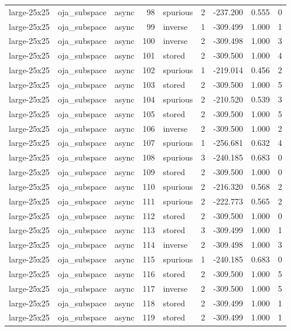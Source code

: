 \begin{tabular}{lllrlrrrr}
large-25x25 & oja\_subspace & async & 98 & spurious & 2 & -237.200 & 0.555 & 0 \\
large-25x25 & oja\_subspace & async & 99 & inverse & 1 & -309.499 & 1.000 & 1 \\
large-25x25 & oja\_subspace & async & 100 & inverse & 2 & -309.498 & 1.000 & 3 \\
large-25x25 & oja\_subspace & async & 101 & stored & 2 & -309.500 & 1.000 & 4 \\
large-25x25 & oja\_subspace & async & 102 & spurious & 1 & -219.014 & 0.456 & 2 \\
large-25x25 & oja\_subspace & async & 103 & stored & 2 & -309.500 & 1.000 & 5 \\
large-25x25 & oja\_subspace & async & 104 & spurious & 2 & -210.520 & 0.539 & 3 \\
large-25x25 & oja\_subspace & async & 105 & stored & 2 & -309.500 & 1.000 & 5 \\
large-25x25 & oja\_subspace & async & 106 & inverse & 2 & -309.500 & 1.000 & 2 \\
large-25x25 & oja\_subspace & async & 107 & spurious & 1 & -256.681 & 0.632 & 4 \\
large-25x25 & oja\_subspace & async & 108 & spurious & 3 & -240.185 & 0.683 & 0 \\
large-25x25 & oja\_subspace & async & 109 & stored & 2 & -309.500 & 1.000 & 0 \\
large-25x25 & oja\_subspace & async & 110 & spurious & 2 & -216.320 & 0.568 & 2 \\
large-25x25 & oja\_subspace & async & 111 & spurious & 2 & -222.773 & 0.565 & 2 \\
large-25x25 & oja\_subspace & async & 112 & stored & 2 & -309.500 & 1.000 & 0 \\
large-25x25 & oja\_subspace & async & 113 & stored & 3 & -309.499 & 1.000 & 1 \\
large-25x25 & oja\_subspace & async & 114 & inverse & 2 & -309.498 & 1.000 & 3 \\
large-25x25 & oja\_subspace & async & 115 & spurious & 1 & -240.185 & 0.683 & 0 \\
large-25x25 & oja\_subspace & async & 116 & stored & 2 & -309.500 & 1.000 & 5 \\
large-25x25 & oja\_subspace & async & 117 & inverse & 2 & -309.500 & 1.000 & 5 \\
large-25x25 & oja\_subspace & async & 118 & stored & 2 & -309.499 & 1.000 & 1 \\
large-25x25 & oja\_subspace & async & 119 & stored & 2 & -309.499 & 1.000 & 1 \\

\end{tabular}
